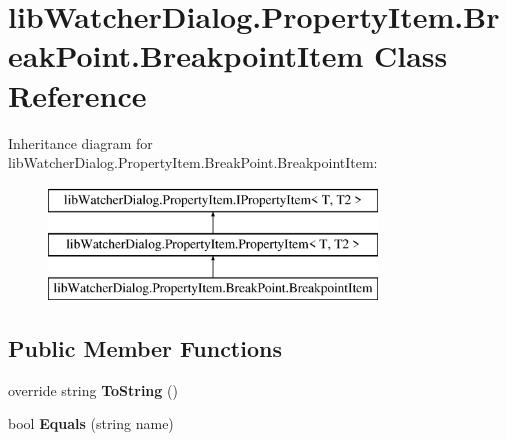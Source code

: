 \hypertarget{classlib_watcher_dialog_1_1_property_item_1_1_break_point_1_1_breakpoint_item}{\section{lib\+Watcher\+Dialog.\+Property\+Item.\+Break\+Point.\+Breakpoint\+Item Class Reference}
\label{classlib_watcher_dialog_1_1_property_item_1_1_break_point_1_1_breakpoint_item}
}
Inheritance diagram for lib\+Watcher\+Dialog.\+Property\+Item.\+Break\+Point.\+Breakpoint\+Item\+:\begin{figure}[H]
\begin{center}
\leavevmode
\includegraphics[height=3.000000cm]{classlib_watcher_dialog_1_1_property_item_1_1_break_point_1_1_breakpoint_item}
\end{center}
\end{figure}
\subsection*{Public Member Functions}
\begin{DoxyCompactItemize}
\item 
\hypertarget{classlib_watcher_dialog_1_1_property_item_1_1_break_point_1_1_breakpoint_item_a5119746513212f61df8fbe9887a6e70d}{override string {\bfseries To\+String} ()}\label{classlib_watcher_dialog_1_1_property_item_1_1_break_point_1_1_breakpoint_item_a5119746513212f61df8fbe9887a6e70d}

\item 
\hypertarget{classlib_watcher_dialog_1_1_property_item_1_1_break_point_1_1_breakpoint_item_af06fbe69992dee6c8bb8a48c28f3efae}{bool {\bfseries Equals} (string name)}\label{classlib_watcher_dialog_1_1_property_item_1_1_break_point_1_1_breakpoint_item_af06fbe69992dee6c8bb8a48c28f3efae}

\end{DoxyCompactItemize}
